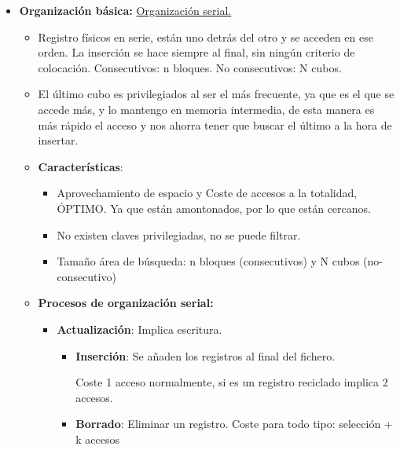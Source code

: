\documentclass[12pt, twoside, openright]{report} %
\begin{document}
  \begin{itemize}
  \item \textbf{Organización básica:} \underline{Organización serial.}
    

    \begin{itemize}
    \item Registro físicos en serie, están uno detrás del otro y se acceden
      en ese orden. La inserción se hace siempre al final, sin ningún
      criterio de colocación. Consecutivos: n bloques. No consecutivos:
      N cubos.
      
    \item El último cubo es privilegiados al ser el más frecuente, ya que es
      el que se accede más, y lo mantengo en memoria intermedia, de esta
      manera es más rápido el acceso y nos ahorra tener que buscar el
      último a la hora de insertar.
      
    \item \textbf{Características}:
      

      \begin{itemize}
      \item Aprovechamiento de espacio y Coste de accesos a la totalidad,
        ÓPTIMO. Ya que están amontonados, por lo que están cercanos.
        
      \item No existen claves privilegiadas, no se puede filtrar.
        
      \item Tamaño área de búsqueda: n bloques (consecutivos) y N cubos
        (no-consecutivo)
        
      \end{itemize}
    \item \textbf{Procesos de organización serial:}
      

      \begin{itemize}
      \item \textbf{Actualización}: Implica escritura.
        

        \begin{itemize}
        \item \textbf{Inserción}: Se añaden los registros al final del
          fichero.
          

          
		  
            Coste 1 acceso normalmente, si es un registro reciclado
            implica 2 accesos.
          
			
        \item \textbf{Borrado}: Eliminar un registro. Coste para todo tipo:
          selección + k accesos
          


\end{itemize}
\end{itemize}
\end{itemize}
\end{itemize}
\end{document}
